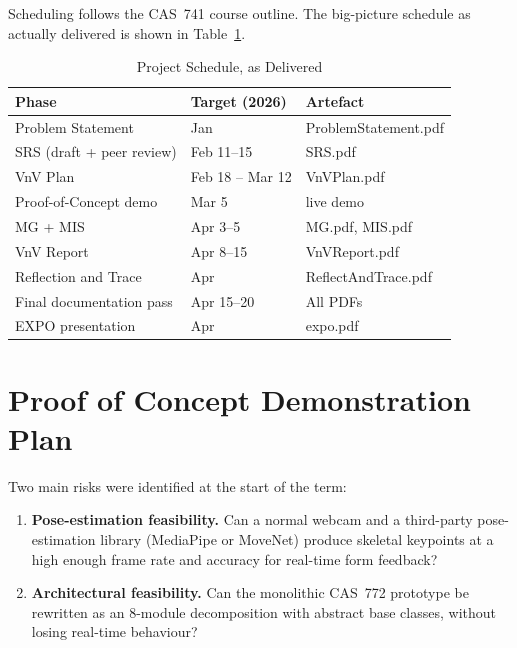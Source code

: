 \documentclass{article}
\begin{document}
Scheduling follows the CAS~741 course outline. The big-picture
schedule as actually delivered is shown in Table~\ref{tab:schedule}.

\begin{table}[h!]
\centering
\begin{tabularx}{\textwidth}{l l X}
\toprule
\textbf{Phase} & \textbf{Target (2026)} & \textbf{Artefact}\\
\midrule
Problem Statement          & Jan                & ProblemStatement.pdf\\
SRS (draft + peer review)  & Feb 11--15         & SRS.pdf\\
VnV Plan                   & Feb 18 -- Mar 12   & VnVPlan.pdf\\
Proof-of-Concept demo      & Mar 5              & live demo\\
MG + MIS                   & Apr 3--5           & MG.pdf, MIS.pdf\\
VnV Report                 & Apr 8--15          & VnVReport.pdf\\
Reflection and Trace       & Apr                & ReflectAndTrace.pdf\\
Final documentation pass   & Apr 15--20         & All PDFs\\
EXPO presentation          & Apr                & expo.pdf\\
\bottomrule
\end{tabularx}
\caption{Project Schedule, as Delivered}
\label{tab:schedule}
\end{table}

\section{Proof of Concept Demonstration Plan}

Two main risks were identified at the start of the term:

\begin{enumerate}
  \item \textbf{Pose-estimation feasibility.} Can a normal webcam and
    a third-party pose-estimation library (MediaPipe or MoveNet)
    produce skeletal keypoints at a high enough frame rate and
    accuracy for real-time form feedback?
  \item \textbf{Architectural feasibility.} Can the monolithic CAS~772
    prototype be rewritten as an 8-module decomposition with abstract
    base classes, without losing real-time behaviour?
\end{enumerate}
\end{document}
